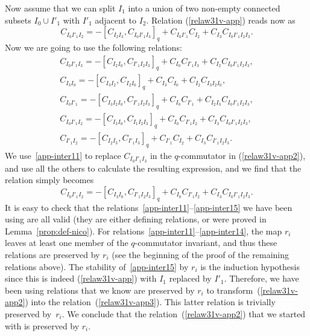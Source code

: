 \documentclass[10pt,a4paper]{amsart}
\numberwithin{equation}{section}
\theoremstyle{definition}
\begin{document}
Now assume that we can split $I_1$ into a union of two non-empty connected subsets $I_0\cup I'_1$ with $I'_1$ adjacent to $I_2$. Relation (\ref{relaw31v-app}) reads now as
\begin{equation}\label{relaw31v-app2}C_{I_0I'_1I_2}=-[C_{I_2I_3},C_{I_0I'_1I_3}]_q+C_{I_0I'_1}C_{I_2}+C_{I_3}C_{I_0I'_1I_2I_3} .
\end{equation}
Now we are going to use the following relations:
 \begin{gather}
C_{I_0I'_1I_3} =-[C_{I_2I_0},C_{I'_1I_2I_3}]_q+C_{I_0}C_{I'_1I_3}+C_{I_2}C_{I_0I'_1I_2I_3}, \label{app-inter11} \\
C_{I_3I_0} =-[C_{I_3I_2},C_{I_2I_0}]_q+C_{I_3}C_{I_0}+C_{I_2}C_{I_3I_2I_0},\label{app-inter12} \\
C_{I_0I'_1} =-[C_{I_3I_2I_0},C_{I'_1I_2I_3}]_q+C_{I_0}C_{I'_1}+C_{I_2I_3}C_{I_0I'_1I_2I_3},\label{app-inter13}\\
C_{I_0I'_1I_2} =-[C_{I_3I_0}, C_{I_1I_2I_3}]_q +C_{I_0}C_{I'_1I_2}+C_{I_3}C_{I_0I'_1I_2I_3},\label{app-inter14}\\
C_{I'_1I_2} =-[C_{I_2I_3},C_{I'_1I_3}]_q+C_{I'_1}C_{I_2}+C_{I_3}C_{I'_1I_2I_3}.\label{app-inter15}
 \end{gather}
We use~\eqref{app-inter11} to replace $C_{I_0I'_1I_3}$ in the $q$-commutator in (\ref{relaw31v-app2}), and use all the others to calculate the resulting expression, and we find that the relation simply becomes
\begin{equation}\label{relaw31v-app3}C_{I_0I'_1I_2}=-[C_{I_3I_0},C_{I'_1I_2I_3}]_q+C_{I_0}C_{I'_1I_2}+C_{I_3}C_{I_0I'_1I_2I_3} .
\end{equation}
It is easy to check that the relations~\eqref{app-inter11}--\eqref{app-inter15} we have been using are all valid (they are either defining relations, or were proved in Lemma~\ref{prop:def-nico}). For relations~\eqref{app-inter11}--\eqref{app-inter14}, the map $r_i$ leaves at least one member of the $q$-commutator invariant, and thus these relations are preserved by $r_i$ (see the beginning of the proof of the remaining relations above). The stability of~\eqref{app-inter15} by $r_i$ is the induction hypothesis since this is indeed (\ref{relaw31v-app}) with $I_1$ replaced by $I'_1$. Therefore, we have been using relations that we know are preserved by $r_i$ to transform~(\ref{relaw31v-app2}) into the relation~(\ref{relaw31v-app3}). This latter relation is trivially preserved by~$r_i$. We conclude that the relation~(\ref{relaw31v-app2}) that we started with is preserved by $r_i$.
\end{document}
